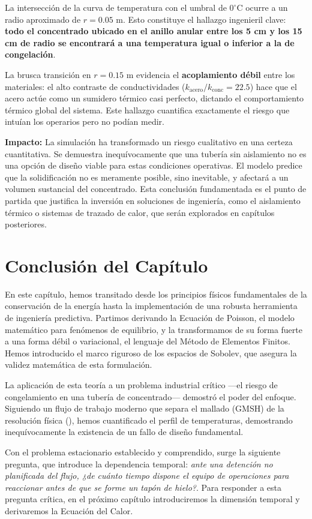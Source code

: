 La intersección de la curva de temperatura con el umbral de \(0^\circ\text{C}\) ocurre a un radio aproximado de \(r=0.05\) m. Esto constituye el hallazgo ingenieril clave: \textbf{todo el concentrado ubicado en el anillo anular entre los 5 cm y los 15 cm de radio se encontrará a una temperatura igual o inferior a la de congelación}.

La brusca transición en \(r = 0.15\) m evidencia el \textbf{acoplamiento débil} entre los materiales: el alto contraste de conductividades (\(k_{\text{acero}}/k_{\text{conc}} = 22.5\)) hace que el acero actúe como un sumidero térmico casi perfecto, dictando el comportamiento térmico global del sistema. Este hallazgo cuantifica exactamente el riesgo que intuían los operarios pero no podían medir.

\textbf{Impacto:} La simulación ha transformado un riesgo cualitativo en una certeza cuantitativa. Se demuestra inequívocamente que una tubería sin aislamiento no es una opción de diseño viable para estas condiciones operativas. El modelo predice que la solidificación no es meramente posible, sino inevitable, y afectará a un volumen sustancial del concentrado. Esta conclusión fundamentada es el punto de partida que justifica la inversión en soluciones de ingeniería, como el aislamiento térmico o sistemas de trazado de calor, que serán explorados en capítulos posteriores.

\section*{Conclusión del Capítulo}

En este capítulo, hemos transitado desde los principios físicos fundamentales de la conservación de la energía hasta la implementación de una robusta herramienta de ingeniería predictiva. Partimos derivando la Ecuación de Poisson, el modelo matemático para fenómenos de equilibrio, y la transformamos de su forma fuerte a una forma débil o variacional, el lenguaje del Método de Elementos Finitos. Hemos introducido el marco riguroso de los espacios de Sobolev, que asegura la validez matemática de esta formulación.

La aplicación de esta teoría a un problema industrial crítico ---el riesgo de congelamiento en una tubería de concentrado--- demostró el poder del enfoque. Siguiendo un flujo de trabajo moderno que separa el mallado (GMSH) de la resolución física (\fenics), hemos cuantificado el perfil de temperaturas, demostrando inequívocamente la existencia de un fallo de diseño fundamental.

Con el problema estacionario establecido y comprendido, surge la siguiente pregunta, que introduce la dependencia temporal: \textit{ante una detención no planificada del flujo, ¿de cuánto tiempo dispone el equipo de operaciones para reaccionar antes de que se forme un tapón de hielo?}. Para responder a esta pregunta crítica, en el próximo capítulo introduciremos la dimensión temporal y derivaremos la Ecuación del Calor.